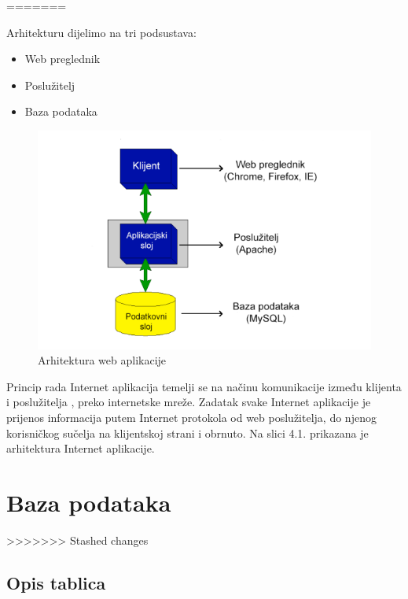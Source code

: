 =======
		
			 Arhitekturu dijelimo na tri podsustava:
		\begin{itemize}
			\item 	Web preglednik
			\item 	Poslužitelj
			\item 	Baza podataka	
		\end{itemize}

		\begin{figure}[H]
			
			\includegraphics[width=\textwidth]{slike/webAplikacija.png} %
			\centering
			\caption{Arhitektura web aplikacije}
			\label{fig:registrirani432132}
		\end{figure}
	
		Princip rada Internet aplikacija temelji se na načinu komunikacije između klijenta i poslužitelja , preko internetske mreže. Zadatak svake Internet aplikacije je prijenos informacija 
		putem Internet protokola od web poslužitelja, do njenog korisničkog sučelja na klijentskoj strani i 
		obrnuto. Na slici 4.1. prikazana je arhitektura Internet aplikacije.

		

			\eject
		\section{Baza podataka}
			
			
>>>>>>> Stashed changes
			
			
		
		
			\subsection{Opis tablica}
			

